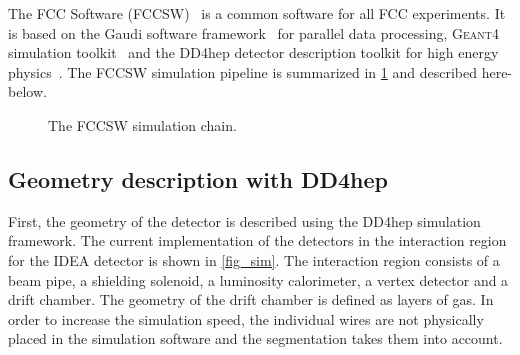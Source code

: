 The FCC Software (FCCSW)~\cite{FCCSW} is a common software for all FCC experiments. It is based on the Gaudi software framework~\cite{Gaudi} for parallel data processing, \textsc{Geant4} simulation toolkit~\cite{Geant4} and the DD4hep detector description toolkit for high energy physics~\cite{DD4hep}. The FCCSW simulation pipeline is summarized in \cref{simu_chain} and described here-below.

\begin{figure}[!h]
\centering
\caption{The FCCSW simulation chain.}
\label{simu_chain}
\end{figure}




\subsection{Geometry description with DD4hep}
First, the geometry of the detector is described using the DD4hep simulation framework. The current implementation of the detectors in the interaction region for the IDEA detector is shown in \cref{fig_sim}. The interaction region consists of a beam pipe, a shielding solenoid, a luminosity calorimeter, a vertex detector and a drift chamber. The geometry of the drift chamber is defined as layers of gas. In order to increase the simulation speed, the individual wires are not physically placed in the simulation software and the segmentation takes them into account.

